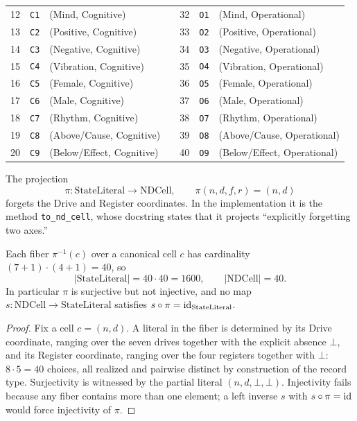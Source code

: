 \begin{longtable}{@{}rllcrll@{}}
12 & \texttt{C1} & (Mind, Cognitive) & & 32 & \texttt{O1} & (Mind, Operational) \\
13 & \texttt{C2} & (Positive, Cognitive) & & 33 & \texttt{O2} & (Positive, Operational) \\
14 & \texttt{C3} & (Negative, Cognitive) & & 34 & \texttt{O3} & (Negative, Operational) \\
15 & \texttt{C4} & (Vibration, Cognitive) & & 35 & \texttt{O4} & (Vibration, Operational) \\
16 & \texttt{C5} & (Female, Cognitive) & & 36 & \texttt{O5} & (Female, Operational) \\
17 & \texttt{C6} & (Male, Cognitive) & & 37 & \texttt{O6} & (Male, Operational) \\
18 & \texttt{C7} & (Rhythm, Cognitive) & & 38 & \texttt{O7} & (Rhythm, Operational) \\
19 & \texttt{C8} & (Above/Cause, Cognitive) & & 39 & \texttt{O8} & (Above/Cause, Operational) \\
20 & \texttt{C9} & (Below/Effect, Cognitive) & & 40 & \texttt{O9} & (Below/Effect, Operational) \\
\end{longtable}

\begin{definition}\label{ch04:def:projection}
The projection
\[
\pi : \mathrm{StateLiteral} \longrightarrow \mathrm{NDCell},
\qquad
\pi(n, d, f, r) = (n, d)
\]
forgets the Drive and Register coordinates. In the implementation it is the
method \texttt{to\_nd\_cell}, whose docstring states that it projects
``explicitly forgetting two axes.''
\end{definition}

\begin{proposition}
\label{ch04:prop:manytoone}
Each fiber $\pi^{-1}(c)$ over a canonical cell $c$ has cardinality
$(7+1)\cdot(4+1) = 40$, so
\[
\lvert \mathrm{StateLiteral} \rvert = 40 \cdot 40 = 1600,
\qquad
\lvert \mathrm{NDCell} \rvert = 40 .
\]
In particular $\pi$ is surjective but not injective, and no map
$s : \mathrm{NDCell} \to \mathrm{StateLiteral}$ satisfies
$s \circ \pi = \mathrm{id}_{\mathrm{StateLiteral}}$.
\end{proposition}

\begin{proof}
Fix a cell $c = (n, d)$. A literal in the fiber is determined by its Drive
coordinate, ranging over the seven drives together with the explicit
absence $\bot$, and its Register coordinate, ranging over the four
registers together with $\bot$: $8 \cdot 5 = 40$ choices, all realized and
pairwise distinct by construction of the record type. Surjectivity is
witnessed by the partial literal $(n, d, \bot, \bot)$. Injectivity fails
because any fiber contains more than one element; a left inverse
$s$ with $s \circ \pi = \mathrm{id}$ would force injectivity of $\pi$.
\end{proof}

